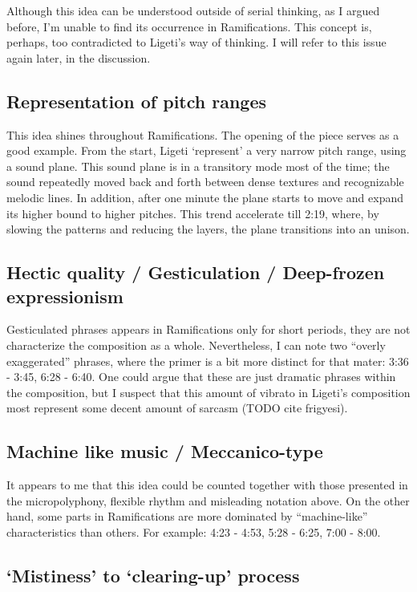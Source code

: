 \documentclass[a4paper,11pt]{article}
\begin{document}
Although this idea can be understood outside of serial thinking, as I argued before, I'm unable to find its occurrence in Ramifications.
This concept is, perhaps, too contradicted to Ligeti's way of thinking.
I will refer to this issue again later, in the discussion.

\subsection*{Representation of pitch ranges}

This idea shines throughout Ramifications.
The opening of the piece serves as a good example.
From the start, Ligeti `represent' a very narrow pitch range, using a sound plane.
This sound plane is in a transitory mode most of the time;
the sound repeatedly moved back and forth between dense textures and recognizable melodic lines.
In addition, after one minute the plane starts to move and expand its higher bound to higher pitches.
This trend accelerate till 2:19, where, by slowing the patterns and reducing the layers, the plane transitions into an unison.

\subsection*{Hectic quality / Gesticulation / Deep-frozen expressionism}

Gesticulated phrases appears in Ramifications only for short periods, they are not characterize the composition as a whole.
Nevertheless, I can note two ``overly exaggerated'' phrases, where the primer is a bit more distinct for that mater: 3:36 - 3:45, 6:28 - 6:40.
One could argue that these are just dramatic phrases within the composition, but I suspect that this amount of vibrato in Ligeti's composition most represent some decent amount of sarcasm (TODO cite frigyesi).

\subsection*{Machine like music / Meccanico-type}

It appears to me that this idea could be counted together with those presented in the micropolyphony, flexible rhythm and misleading notation above.
On the other hand, some parts in Ramifications are more dominated by ``machine-like'' characteristics than others.
For example: 4:23 - 4:53, 5:28 - 6:25, 7:00 - 8:00.

\subsection*{‘Mistiness’ to ‘clearing-up’ process}
\end{document}
